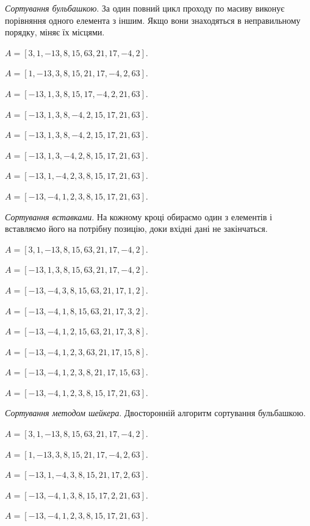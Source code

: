 \documentclass[a4paper,oneside,DIV=12,12pt]{scrartcl}
\newcommand{\subproblem}[1]{\textit{#1}.}
\begin{document}
	\begin{solution}
		\subproblem{Сортування бульбашкою}
			За один повний цикл проходу по масиву виконує порівняння одного елемента з іншим. Якщо вони знаходяться в неправильному порядку, міняє їх місцями.
			
			\begin{steps}
				\item $A = [3, 1, -13, 8, 15, 63, 21, 17, -4, 2]$.
				\item $A = [1, -13, 3, 8, 15, 21, 17, -4, 2, 63]$.
				\item $A = [-13, 1, 3, 8, 15, 17, -4, 2, 21, 63]$.
				\item $A = [-13, 1, 3, 8, -4, 2, 15, 17, 21, 63]$.
				\item $A = [-13, 1, 3, 8, -4, 2, 15, 17, 21, 63]$.
				\item $A = [-13, 1, 3, -4, 2, 8, 15, 17, 21, 63]$.
				\item $A = [-13, 1, -4, 2, 3, 8, 15, 17, 21, 63]$.
				\item $A = [-13, -4, 1, 2, 3, 8, 15, 17, 21, 63]$.
			\end{steps}
			
		\subproblem{Сортування вставками}
			На кожному кроці обираємо один з елементів і вставляємо його на потрібну позицію, доки вхідні дані не закінчаться.
			\begin{steps}
				\item $A = [3, 1, -13, 8, 15, 63, 21, 17, -4, 2]$.  
				\item $A = [-13, 1, 3, 8, 15, 63, 21, 17, -4, 2]$.
				\item $A = [-13, -4, 3, 8, 15, 63, 21, 17, 1, 2]$.
				\item $A = [-13, -4, 1, 8, 15, 63, 21, 17, 3, 2]$.
				\item $A = [-13, -4, 1, 2, 15, 63, 21, 17, 3, 8]$.
				\item $A = [-13, -4, 1, 2, 3, 63, 21, 17, 15, 8]$.
				\item $A = [-13, -4, 1, 2, 3, 8, 21, 17, 15, 63]$.
				\item $A = [-13, -4, 1, 2, 3, 8, 15, 17, 21, 63]$.
			\end{steps}
			
		\subproblem{Сортування методом шейкера}
			Двосторонній алгоритм сортування бульбашкою. 
			\begin{steps}
				\item $A = [3, 1, -13, 8, 15, 63, 21, 17, -4, 2]$.  
				\item $A = [1, -13, 3, 8, 15, 21, 17, -4, 2, 63]$.
				\item $A = [-13, 1, -4, 3, 8, 15, 21, 17, 2, 63]$.
				\item $A = [-13, -4, 1, 3, 8, 15, 17, 2, 21, 63]$.
				\item $A = [-13, -4, 1, 2, 3, 8, 15, 17, 21, 63]$.
			\end{steps}
			
	\end{solution}
	
\end{document}

